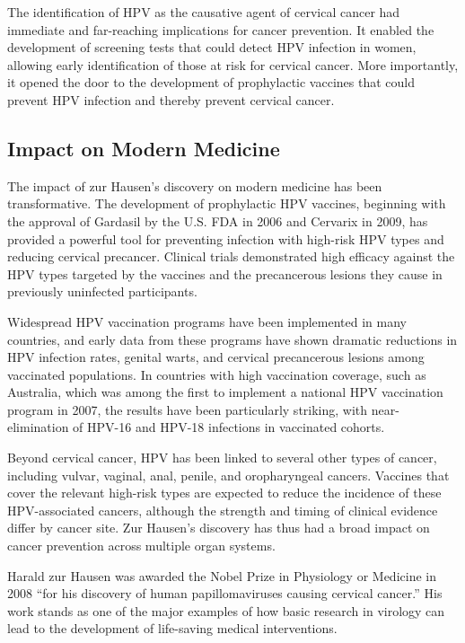 The identification of HPV as the causative agent of cervical cancer had immediate and far-reaching implications for cancer prevention. It enabled the development of screening tests that could detect HPV infection in women, allowing early identification of those at risk for cervical cancer. More importantly, it opened the door to the development of prophylactic vaccines that could prevent HPV infection and thereby prevent cervical cancer.

\subsection{Impact on Modern Medicine}

The impact of zur Hausen's discovery on modern medicine has been transformative. The development of prophylactic HPV vaccines, beginning with the approval of Gardasil by the U.S. FDA in 2006 and Cervarix in 2009, has provided a powerful tool for preventing infection with high-risk HPV types and reducing cervical precancer. Clinical trials demonstrated high efficacy against the HPV types targeted by the vaccines and the precancerous lesions they cause in previously uninfected participants.

Widespread HPV vaccination programs have been implemented in many countries, and early data from these programs have shown dramatic reductions in HPV infection rates, genital warts, and cervical precancerous lesions among vaccinated populations. In countries with high vaccination coverage, such as Australia, which was among the first to implement a national HPV vaccination program in 2007, the results have been particularly striking, with near-elimination of HPV-16 and HPV-18 infections in vaccinated cohorts.

Beyond cervical cancer, HPV has been linked to several other types of cancer, including vulvar, vaginal, anal, penile, and oropharyngeal cancers. Vaccines that cover the relevant high-risk types are expected to reduce the incidence of these HPV-associated cancers, although the strength and timing of clinical evidence differ by cancer site. Zur Hausen's discovery has thus had a broad impact on cancer prevention across multiple organ systems.

Harald zur Hausen was awarded the Nobel Prize in Physiology or Medicine in 2008 ``for his discovery of human papillomaviruses causing cervical cancer.'' His work stands as one of the major examples of how basic research in virology can lead to the development of life-saving medical interventions.

